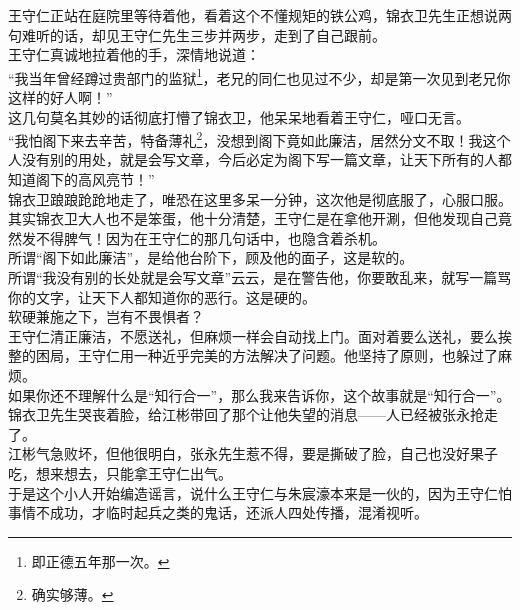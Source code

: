 \begin{multicols}{\theparacolNo}
王守仁正站在庭院里等待着他，看着这个不懂规矩的铁公鸡，锦衣卫先生正想说两句难听的话，却见王守仁先生三步并两步，走到了自己跟前。\\

王守仁真诚地拉着他的手，深情地说道：\\

“我当年曾经蹲过贵部门的监狱\footnote{即正德五年那一次。}，老兄的同仁也见过不少，却是第一次见到老兄你这样的好人啊！”\\

这几句莫名其妙的话彻底打懵了锦衣卫，他呆呆地看着王守仁，哑口无言。\\

“我怕阁下来去辛苦，特备薄礼\footnote{确实够薄。}，没想到阁下竟如此廉洁，居然分文不取！我这个人没有别的用处，就是会写文章，今后必定为阁下写一篇文章，让天下所有的人都知道阁下的高风亮节！”\\

锦衣卫踉踉跄跄地走了，唯恐在这里多呆一分钟，这次他是彻底服了，心服口服。\\

其实锦衣卫大人也不是笨蛋，他十分清楚，王守仁是在拿他开涮，但他发现自己竟然发不得脾气！因为在王守仁的那几句话中，也隐含着杀机。\\

所谓“阁下如此廉洁”，是给他台阶下，顾及他的面子，这是软的。\\

所谓“我没有别的长处就是会写文章”云云，是在警告他，你要敢乱来，就写一篇骂你的文字，让天下人都知道你的恶行。这是硬的。\\

软硬兼施之下，岂有不畏惧者？\\

王守仁清正廉洁，不愿送礼，但麻烦一样会自动找上门。面对着要么送礼，要么挨整的困局，王守仁用一种近乎完美的方法解决了问题。他坚持了原则，也躲过了麻烦。\\

如果你还不理解什么是“知行合一”，那么我来告诉你，这个故事就是“知行合一”。\\

锦衣卫先生哭丧着脸，给江彬带回了那个让他失望的消息——人已经被张永抢走了。\\

江彬气急败坏，但他很明白，张永先生惹不得，要是撕破了脸，自己也没好果子吃，想来想去，只能拿王守仁出气。\\

于是这个小人开始编造谣言，说什么王守仁与朱宸濠本来是一伙的，因为王守仁怕事情不成功，才临时起兵之类的鬼话，还派人四处传播，混淆视听。\\


\end{multicols}
